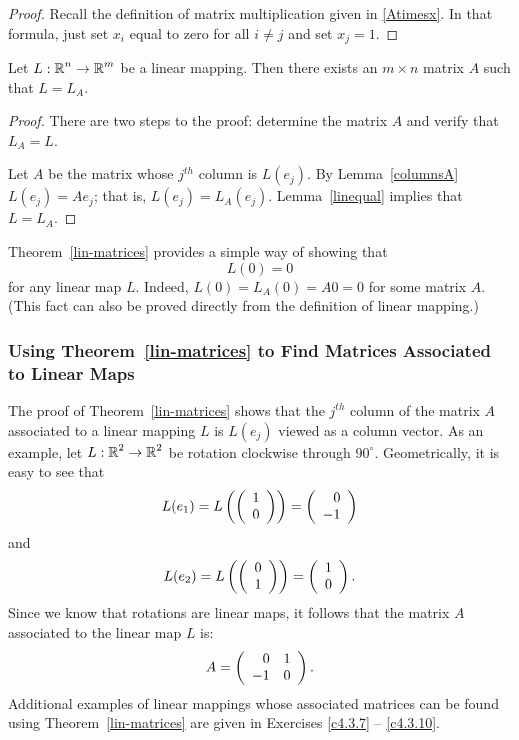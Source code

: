 \documentclass{ximera}
\begin{document}
\begin{proof}  Recall the definition of matrix multiplication given in \eqref{Atimesx}.
In that formula, just set $x_i$ equal to zero for all $i\neq j$ and set
$x_j=1$. \end{proof}

\begin{theorem}  \label{lin-matrices}
Let $L:\mbox{$\Bbb{R}$}^n\to\mbox{$\Bbb{R}$}^m$ be a linear mapping.
Then there exists an $m\times n$ matrix $A$ such that $L=L_A$.
\end{theorem}

\begin{proof}
There are two steps to the proof: determine the matrix $A$ and
verify that $L_A=L$.

Let $A$ be the matrix whose $j^{th}$ column is $L(e_j)$.  By
Lemma~\ref{columnsA} $L(e_j) = Ae_j$; that is, $L(e_j) = L_A(e_j)$.
Lemma~\ref{linequal} implies that $L=L_A$.  \end{proof}

Theorem~\ref{lin-matrices} provides a simple way of showing that
\[
L(0) = 0
\]
for any linear map $L$.  Indeed, $L(0)=L_A(0)=A0=0$ for some matrix $A$.  
(This fact can also be proved directly from the definition of linear mapping.)

\subsubsection*{Using Theorem~\protect\ref{lin-matrices} to Find Matrices
Associated to Linear Maps}

The proof of Theorem~\ref{lin-matrices} shows that the $j^{th}$ column of the
matrix $A$ associated to a linear mapping $L$ is $L(e_j)$ viewed as a column
vector.  As an example, let $L:\mbox{$\Bbb{R}$}^2\to\mbox{$\Bbb{R}$}^2$ be rotation clockwise through
$90^\circ$.  Geometrically, it is easy to see that
\[
  L(e_1) = L\left(\left(\begin{array}{r} 1 \\ 0\end{array}\right)\right) = \left(\begin{array}{r} 0 \\ -1\end{array}\right)
\]
and
\[
L(e_2) = L\left(\left(\begin{array}{r} 0 \\ 1\end{array}\right)\right) = \left(\begin{array}{r} 1 \\ 0\end{array}\right).
\]
Since we know that rotations are linear maps, it follows that the matrix
$A$ associated to the linear map $L$ is:
\[
A = \left(\begin{array}{rr} 0 & 1\\ -1 &0\end{array}\right).
\]
Additional examples of linear mappings whose associated matrices can be found
using Theorem~\ref{lin-matrices} are given in Exercises \ref{c4.3.7} --
\ref{c4.3.10}.



\EXER

\TEXER
\end{document}

